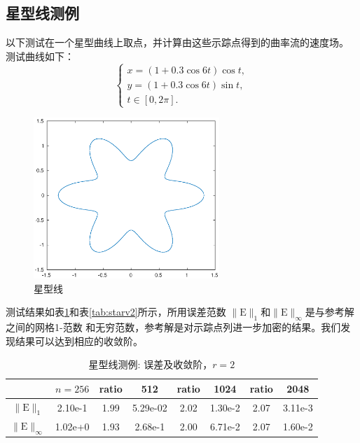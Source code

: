 \documentclass[a4paper,twoside]{ctexart}
\begin{document}
  \subsection{星型线测例}

以下测试在一个星型曲线上取点，并计算由这些示踪点得到的曲率流的速度场。
测试曲线如下：
\begin{equation}
  \label{eq:star}
  \left\{
  \begin{array}{l}
    x=(1+0.3\cos{6t})\cos{t},\\
    y=(1+0.3\cos{6t})\sin{t},\\
    t \in [0,2\pi].
  \end{array}
  \right.
\end{equation}

\begin{figure}[!htp]                                                                       
  \centering                                                                           
  \includegraphics[width=7cm]{star.eps}                                           
  \caption{星型线}                        
\end{figure}

测试结果如表\ref{tab:starv1}和表\ref{tab:starv2}所示，所用误差范数
$\|\mathrm{E}\|_1$和$\|\mathrm{E}\|_{\infty}$是与参考解之间的网格1-范数
和无穷范数，参考解是对示踪点列进一步加密的结果。我们发现结果可以达到相应的收敛阶。

\begin{table}[htbp]
    \centering\begin{tabular}{c|ccccccc}
        \hline
         &$n=256$&ratio&512&ratio&1024&ratio&2048\\
        \hline
        $\|\mathrm{E}\|_1$&2.10e-1&1.99&5.29e-02&2.02&1.30e-2&2.07&3.11e-3\\
        \hline
        $\|\mathrm{E}\|_{\infty}$&1.02e+0&1.93&2.68e-1&2.00&6.71e-2&2.07&1.60e-2\\
        \hline
    \end{tabular}
    \caption{星型线测例: 误差及收敛阶，$r = 2$}
    \label{tab:starv1}
  \end{table}
\end{document}

